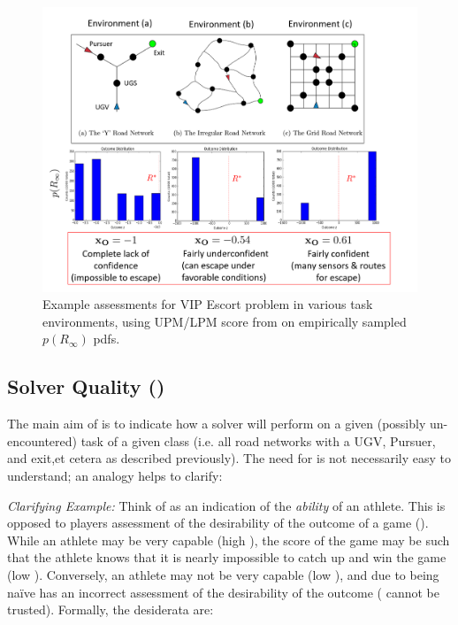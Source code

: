 \begin{figure}[tbp]
    \centering
    \includegraphics[width=0.99\linewidth]{Figures/xO_envsOnly.png}
    \caption{Example \xO{} assessments for VIP Escort problem in various task environments, using UPM/LPM score from \cite{Aitken2016-cv} on empirically sampled $p(R_{\infty})$ pdfs.}
    \label{fig:xOexample}
\end{figure}


\subsection{Solver Quality (\xQ)} \label{sec:SQ}
    The main aim of \xQ{} is to indicate how a solver \solve{} will perform on a given (possibly un-encountered) task \task{} of a given class \taskclass{} (i.e. all road networks with a UGV, Pursuer, and exit,et cetera as described previously). The need for \xQ{} is not necessarily easy to understand; an analogy helps to clarify:
    
    \emph{Clarifying Example:} Think of \xQ{} as an indication of the \emph{ability} of an athlete. This is opposed to players assessment of the desirability of the outcome of a game (\xO). While an athlete may be very capable (high \xQ), the score of the game may be such that the athlete knows that it is nearly impossible to catch up and win the game (low \xO). Conversely, an athlete may not be very capable (low \xQ), and due to being na\"{i}ve has an incorrect assessment of the desirability of the outcome (\xO{} cannot be trusted). Formally, the desiderata are:
    
